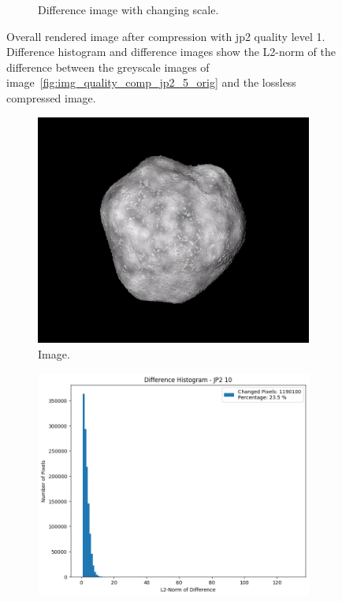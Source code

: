 \begin{figure}[htb]
\begin{subfigure}[b]{0.48\textwidth}
        \caption{Difference image with changing scale.}
        \label{fig:img_quality_comp_jp2_5_diff_rel}
    \end{subfigure}
    \caption{Overall rendered image after compression with \gls{jp2} quality level 1. Difference histogram and difference images show the L2-norm of the difference between the greyscale images of image~\ref{fig:img_quality_comp_jp2_5_orig} and the lossless compressed image.}
    \label{fig:img_quality_comp_jp2_5}
\end{figure}


\begin{figure}[htb]
    \centering
    \begin{subfigure}[b]{0.48\textwidth}
        \centering
        \includegraphics[width=\textwidth]{doc/thesis/0_figures/compare_quality/set1/jp2_10.png}
        \caption{Image.}
        \label{fig:img_quality_comp_jp2_10_orig}
    \end{subfigure}
    \begin{subfigure}[b]{0.48\textwidth}
        \centering
        \includegraphics[width=\textwidth]{doc/thesis/0_figures/compare_quality/set1/jp2_10_diff_histogram.png}

\end{subfigure}
\end{figure}
